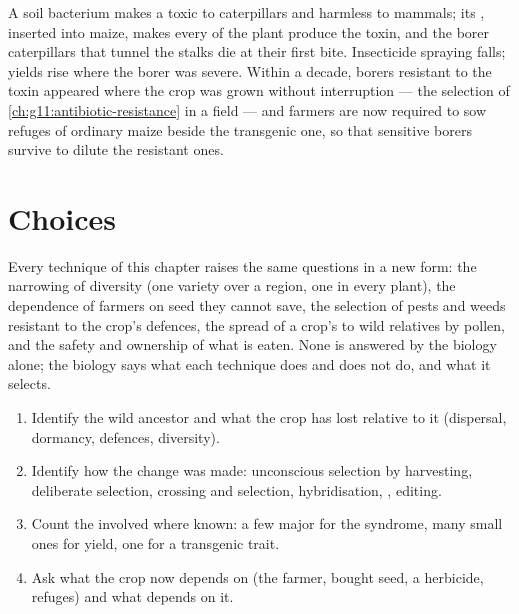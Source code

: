 \begin{example}\label{ex:g12:domesticated-plants:bt}
A soil bacterium makes a  toxic to caterpillars and harmless to
mammals; its , inserted into maize, makes every  of the plant
produce the toxin, and the borer caterpillars that tunnel the stalks
die at their first bite. Insecticide spraying falls; yields rise where
the borer was severe. Within a decade, borers resistant to the toxin
appeared where the crop was grown without interruption --- the
selection of \cref{ch:g11:antibiotic-resistance} in a field --- and
farmers are now required to sow refuges of ordinary maize beside the
transgenic one, so that sensitive borers survive to dilute the
resistant ones.
\end{example}

\section{Choices}

\begin{proposition}\label{prop:g12:domesticated-plants:stakes}
Every technique of this chapter raises the same questions in a new
form: the narrowing of diversity (one variety over a region, one 
in every plant), the dependence of farmers on seed they cannot save,
the selection of pests and weeds resistant to the crop's defences, the
spread of a crop's  to wild relatives by pollen, and the safety
and ownership of what is eaten. None is answered by the biology alone;
the biology says what each technique does and does not do, and what it
selects.
\end{proposition}
\admitted

\begin{method}\label{met:g12:domesticated-plants:read}
\begin{enumerate}
  \item Identify the wild ancestor and what the crop has lost relative
        to it (dispersal, dormancy, defences, diversity).
  \item Identify how the change was made: unconscious selection by
        harvesting, deliberate selection, crossing and selection,
        hybridisation, , editing.
  \item Count the  involved where known: a few major  for
        the  syndrome, many small ones for yield, one
        for a transgenic trait.
  \item Ask what the crop now depends on (the farmer, bought seed, a
        herbicide, refuges) and what depends on it.
\end{enumerate}
\end{method}


